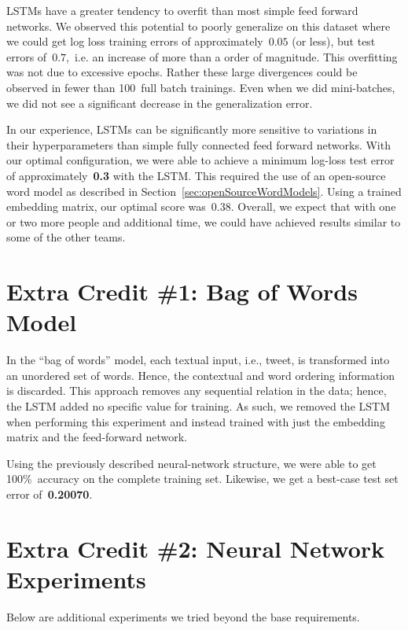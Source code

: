 \documentclass{report}
\begin{document}
  LSTMs have a greater tendency to overfit than most simple feed forward networks.  We observed this potential to poorly generalize on this dataset where we could get log loss training errors of approximately~$0.05$ (or less), but test errors of~$0.7$,~i.e. an increase of more than a order of magnitude.  This overfitting was not due to excessive epochs.  Rather these large divergences could be observed in fewer than 100~full batch trainings.  Even when we did mini-batches, we did not see a significant decrease in the generalization error.
  
  In our experience, LSTMs can be significantly more sensitive to variations in their hyperparameters than simple fully connected feed forward networks.  With our optimal configuration, we were able to achieve a minimum log-loss test error of approximately~\textbf{0.3} with the LSTM.  This required the use of an open-source word model as described in Section~\ref{sec:openSourceWordModels}.  Using a trained embedding matrix, our optimal score was~{0.38}. Overall, we expect that with one or two more people and additional time, we could have achieved results similar to some of the other teams.
    
  \section{Extra Credit \#1: Bag of Words Model}\label{sec:bagOfWords}
    
  In the ``bag of words'' model, each textual input, i.e., tweet, is transformed into an unordered set of words.  Hence, the contextual and word ordering information is discarded.  This approach removes any sequential relation in the data; hence, the LSTM added no specific value for training.  As such, we removed the LSTM when performing this experiment and instead trained with just the embedding matrix and the feed-forward network. 
  
  Using the previously described neural-network structure, we were able to get 100\%~accuracy on the complete training set.  Likewise, we get a best-case test set error of~\textbf{0.20070}.
  
  \section{Extra Credit \#2: Neural Network Experiments}\label{sec:extraNnExperiments}
  
  Below are additional experiments we tried beyond the base requirements.  
  
\end{document}
